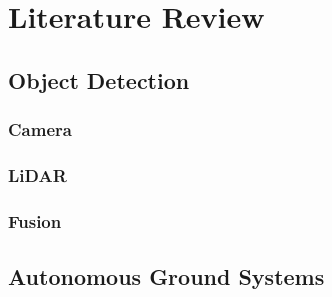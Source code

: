 \documentclass{erauthesis}
\begin{document}
\chapter{Literature Review} \label{litReview}


\section{Object Detection} \label{LR:Detection}
\subsection{Camera} \label{LR:Detection_Cam}
\subsection{LiDAR} \label{LR:Detection_LiDAR}
\subsection{Fusion} \label{LR:Detection_Fusion}


\section{Autonomous Ground Systems} \label{LR:AGS}

\end{document}
